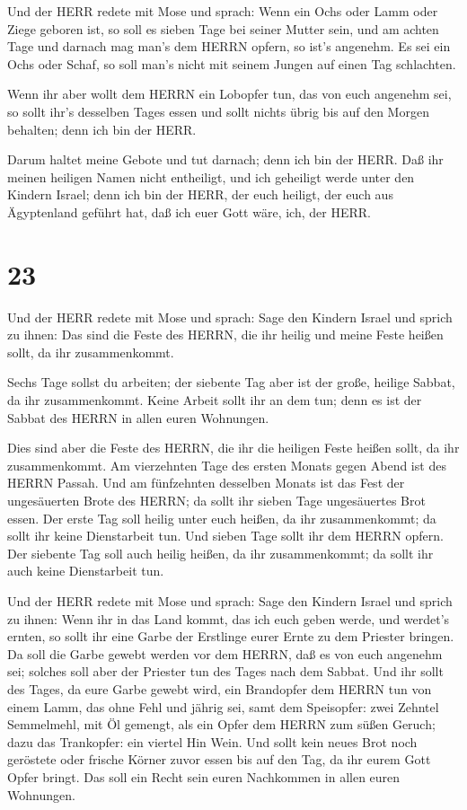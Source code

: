  Und der HERR redete mit Mose und sprach: 
Wenn ein Ochs oder Lamm oder Ziege geboren ist, so soll es sieben Tage
bei seiner Mutter sein, und am achten Tage und darnach mag man's dem
HERRN opfern, so ist's angenehm.  Es sei ein Ochs oder
Schaf, so soll man's nicht mit seinem Jungen auf einen Tag schlachten.

 Wenn ihr aber wollt dem HERRN ein Lobopfer tun, das von
euch angenehm sei,  so sollt ihr's desselben Tages essen
und sollt nichts übrig bis auf den Morgen behalten; denn ich bin der
HERR.

 Darum haltet meine Gebote und tut darnach; denn ich bin
der HERR.  Daß ihr meinen heiligen Namen nicht entheiligt,
und ich geheiligt werde unter den Kindern Israel; denn ich bin der HERR,
der euch heiligt,  der euch aus Ägyptenland geführt hat,
daß ich euer Gott wäre, ich, der HERR.

\hypertarget{section-22}{%
\section{23}\label{section-22}}

 Und der HERR redete mit Mose und sprach:  Sage
den Kindern Israel und sprich zu ihnen: Das sind die Feste des HERRN,
die ihr heilig und meine Feste heißen sollt, da ihr zusammenkommt.

 Sechs Tage sollst du arbeiten; der siebente Tag aber ist
der große, heilige Sabbat, da ihr zusammenkommt. Keine Arbeit sollt ihr
an dem tun; denn es ist der Sabbat des HERRN in allen euren Wohnungen.

 Dies sind aber die Feste des HERRN, die ihr die heiligen
Feste heißen sollt, da ihr zusammenkommt.  Am vierzehnten
Tage des ersten Monats gegen Abend ist des HERRN Passah. 
Und am fünfzehnten desselben Monats ist das Fest der ungesäuerten Brote
des HERRN; da sollt ihr sieben Tage ungesäuertes Brot essen.
 Der erste Tag soll heilig unter euch heißen, da ihr
zusammenkommt; da sollt ihr keine Dienstarbeit tun.  Und
sieben Tage sollt ihr dem HERRN opfern. Der siebente Tag soll auch
heilig heißen, da ihr zusammenkommt; da sollt ihr auch keine
Dienstarbeit tun.

 Und der HERR redete mit Mose und sprach:  Sage
den Kindern Israel und sprich zu ihnen: Wenn ihr in das Land kommt, das
ich euch geben werde, und werdet's ernten, so sollt ihr eine Garbe der
Erstlinge eurer Ernte zu dem Priester bringen.  Da soll die
Garbe gewebt werden vor dem HERRN, daß es von euch angenehm sei; solches
soll aber der Priester tun des Tages nach dem Sabbat.  Und
ihr sollt des Tages, da eure Garbe gewebt wird, ein Brandopfer dem HERRN
tun von einem Lamm, das ohne Fehl und jährig sei,  samt dem
Speisopfer: zwei Zehntel Semmelmehl, mit Öl gemengt, als ein Opfer dem
HERRN zum süßen Geruch; dazu das Trankopfer: ein viertel Hin Wein.
 Und sollt kein neues Brot noch geröstete oder frische
Körner zuvor essen bis auf den Tag, da ihr eurem Gott Opfer bringt. Das
soll ein Recht sein euren Nachkommen in allen euren Wohnungen.

